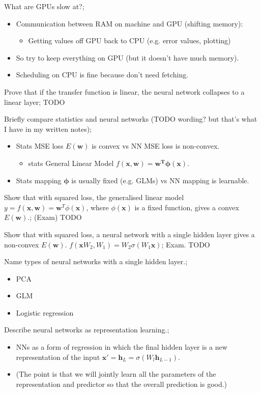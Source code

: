 \documentclass{article}
\begin{document}
What are GPUs slow at?; \begin{itemize} \item Communication between RAM on machine and GPU (shifting memory): \begin{itemize} \item Getting values off GPU back to CPU (e.g. error values, plotting) \end{itemize} \item So try to keep everything on GPU (but it doesn't have much memory). \item Scheduling on CPU is fine because don't need fetching. \end{itemize}

Prove that if the transfer function is linear, the neural network collapses to a linear layer; TODO

Briefly compare statistics and neural networks (TODO wording? but that's what I have in my written notes); \begin{itemize} \item Stats MSE loss $E(\mathbf{w})$ is convex vs NN MSE loss is non-convex. \begin{itemize} \item stats General Linear Model $f(\mathbf{x, w})=\mathbf{w^T\phi(x)}$. \end{itemize} \item Stats mapping $\mathbf{\phi}$ is usually fixed (e.g. GLMs) vs NN mapping is learnable. \end{itemize}

Show that with squared loss, the generalised linear model $y = f(\bm{x,w})=\bm{w}^T\phi(\bm{x})$, where $\phi(\bm{x})$ is a fixed function, gives a convex $E(\bm{w})$.; (Exam) TODO

Show that with squared loss, a neural network with a single hidden layer gives a non-convex $E(\bm{w})$. $f(\bm{x} W_2, W_1) = W_2\sigma(W_1 \bm{x})$; Exam. TODO

Name types of neural networks with a single hidden layer.; \begin{itemize} \item PCA \item GLM \item Logistic regression \end{itemize}

Describe neural networks as representation learning.; \begin{itemize} \item NNs as a form of regression in which the final hidden layer is a new representation of the input $\bm{x'} = \bm{h}_L = \sigma(W_l\bm{h}_{L-1})$. \item (The point is that we will jointly learn all the parameters of the representation and predictor so that the overall prediction is good.) \end{itemize}
\end{document}
